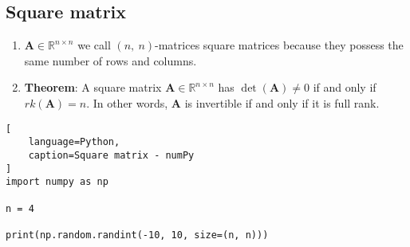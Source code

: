 \subsection{Square matrix}

\begin{enumerate}
    \item $\bm{A} \in \mathbb{R}^{n\times n}$ we call $(n,\ n)$-matrices square matrices because they possess the same number of rows and columns.
    \hfill \cite{mfml/book/mml/Deisenroth-Faisal-Ong}

    \item \textbf{Theorem}: A square matrix $\bm{A} \in \mathbb{R}^{n\times n}$ has $\det(\bm{A}) \neq 0$ if and only if $rk(\bm{A}) = n$. 
    In other words, $\bm{A}$ is invertible if and only if it is full rank.
    \hfill \cite{mfml/book/mml/Deisenroth-Faisal-Ong}
\end{enumerate}


\begin{lstlisting}[
    language=Python,
    caption=Square matrix - numPy
]
import numpy as np

n = 4

print(np.random.randint(-10, 10, size=(n, n)))
\end{lstlisting}


